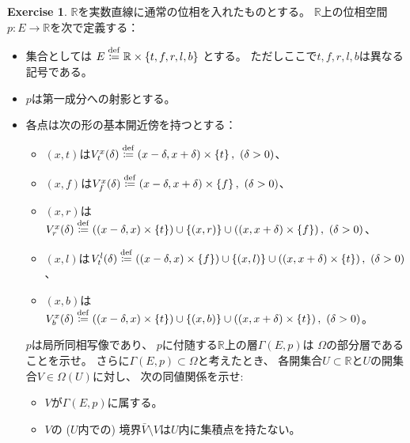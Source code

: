 \documentclass[uplatex]{jsarticle}
\theoremstyle{definition}
\newtheorem{prob}[prob]{Exercise}
\def\R{\mathbb{R}}
\newcommand{\dfn}{\overset{\mathrm{\tiny def}}{\coloneqq}}
\begin{document}
\begin{prob}\label{prob: 0.5}
  \(\R\)を実数直線に通常の位相を入れたものとする。
  \(\R\)上の位相空間\(p:E\to \R\)を次で定義する：
  \begin{itemize}
    \item
    集合としては
    \(E \dfn \R \times \left\{ t,f,r,l,b\right\}\)
    とする。
    ただしここで\(t,f,r,l,b\)は異なる記号である。
    \item
    \(p\)は第一成分への射影とする。
    \item
    各点は次の形の基本開近傍を持つとする：
    \begin{itemize}
      \item[\(\star\)]
      \((x,t)\)は\(V_t^x(\delta) \dfn (x-\delta,x+\delta)\times \left\{ t\right\} , \ (\delta > 0)\)、
      \item[\(\star\)]
      \((x,f)\)は\(V_f^x(\delta) \dfn (x-\delta,x+\delta)\times \left\{ f\right\} , \ (\delta > 0)\)、
      \item[\(\star\)]
      \((x,r)\)は\(V_r^x(\delta) \dfn \left( (x-\delta,x)\times \left\{ t\right\}\right)
      \cup \left\{ (x,r)\right\} \cup \left( (x,x+\delta) \times \left\{ f\right\}\right), \ (\delta > 0)\)、
      \item[\(\star\)]
      \((x,l)\)は\(V_t^l(\delta) \dfn \left( (x-\delta,x)\times \left\{ f\right\}\right)
      \cup \left\{ (x,l)\right\} \cup \left( (x,x+\delta) \times \left\{ t\right\}\right), \ (\delta > 0)\)、
      \item[\(\star\)]
      \((x,b)\)は\(V_b^x(\delta) \dfn \left( (x-\delta,x)\times \left\{ t\right\}\right)
      \cup \left\{ (x,b)\right\} \cup \left( (x,x+\delta) \times \left\{ t\right\}\right), \ (\delta > 0)\)。
    \end{itemize}
    \(p\)は局所同相写像であり、
    \(p\)に付随する\(\R\)上の層\(\Gamma(E,p)\)は
    \(\Omega\)の部分層であることを示せ。
    さらに\(\Gamma(E,p)\subset \Omega\)と考えたとき、
    各開集合\(U\subset \R\)と\(U\)の開集合\(V\in \Omega(U)\)に対し、
    次の同値関係を示せ:
    \begin{itemize}
      \item[ \ ]
      \(V\)が\(\Gamma(E,p)\)に属する。
      \item[\(\Leftrightarrow\)]
      \(V\)の (\(U\)内での) 境界\(\bar{V}\setminus V\)は\(U\)内に集積点を持たない。
    \end{itemize}
  \end{itemize}
\end{prob}
\end{document}

